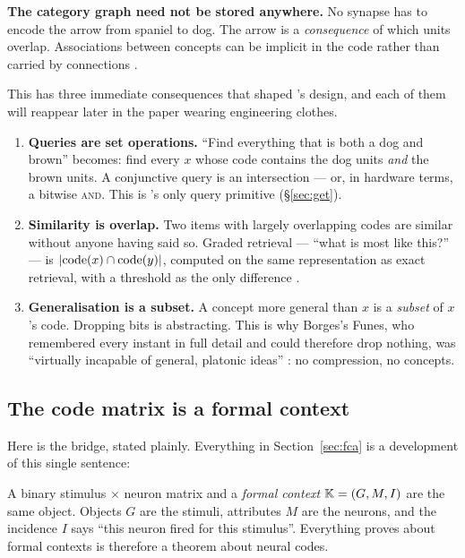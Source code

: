 \begin{keyidea}
\textbf{The category graph need not be stored anywhere.} No synapse has to
encode the arrow from spaniel to dog. The arrow is a \emph{consequence} of
which units overlap. Associations between concepts can be implicit in the
code rather than carried by connections \citep{foldiak2003}.
\end{keyidea}

This has three immediate consequences that shaped \odag{}'s design, and each
of them will reappear later in the paper wearing engineering clothes.

\begin{enumerate}[leftmargin=1.6em]
\item \textbf{Queries are set operations.} ``Find everything that is both a
  dog and brown'' becomes: find every $x$ whose code contains the dog units
  \emph{and} the brown units. A conjunctive query is an intersection --- or,
  in hardware terms, a bitwise \textsc{and}. This is \odag{}'s only query
  primitive (\S\ref{sec:get}).
\item \textbf{Similarity is overlap.} Two items with largely overlapping codes
  are similar without anyone having said so. Graded retrieval --- ``what is
  most like this?'' --- is $|\mathrm{code}(x) \cap \mathrm{code}(y)|$, computed on the same
  representation as exact retrieval, with a threshold as the only difference
  \citep{foldiak2003}.
\item \textbf{Generalisation is a subset.} A concept more general than $x$ is
  a \emph{subset} of $x$'s code. Dropping bits is abstracting. This is why
  Borges's Funes, who remembered every instant in full detail and could
  therefore drop nothing, was ``virtually incapable of general, platonic
  ideas'' \citep{borges1942}: no compression, no concepts.
\end{enumerate}

\subsection{The code matrix is a formal context}
\label{sec:code-is-context}

Here is the bridge, stated plainly. Everything in
Section~\ref{sec:fca} is a development of this single sentence:

\begin{keyidea}
A binary stimulus $\times$ neuron matrix and a \emph{formal context}
$\mathbb{K} = (G, M, I)$ are the same object. Objects $G$ are the stimuli,
attributes $M$ are the neurons, and the incidence $I$ says ``this neuron fired
for this stimulus''. Everything \fca{} proves about formal contexts is
therefore a theorem about neural codes.
\end{keyidea}

